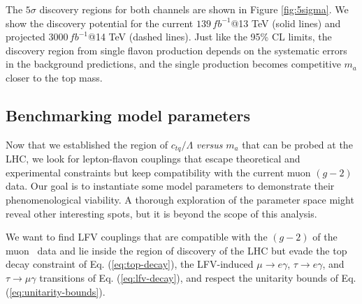 \documentclass[prd,amsfonts,onecolumn,superscriptaddress,aps,nofootinbib,11pt]{revtex4-1}
\begin{document}
The $5\sigma$ discovery regions for both channels are shown in Figure \ref{fig:5sigma}. We show the discovery potential for the current $139 \, \si{fb^{-1}}$@13 TeV (solid lines) and projected $3000 \, \si{fb^{-1}}$@14 TeV (dashed lines). Just like the 95\% CL limits, the discovery region from single flavon production depends on the systematic errors in the background predictions, and the single production becomes competitive $m_a$ closer to the top mass.

\subsection{Benchmarking model parameters}

Now that we established the region of $c_{tq}/\Lambda$ {\it versus} $m_a$ that can be probed at the LHC, we look for lepton-flavon couplings that escape theoretical and experimental constraints but keep compatibility with the current muon $(g-2)$ data. Our goal is to instantiate some model parameters to demonstrate their phenomenological viability. A thorough exploration of the parameter space might reveal other interesting spots, but it is beyond the scope of this analysis.


We want to find  LFV couplings that are compatible with the $(g-2)$ of the muon~\cite{Muong-2:2006rrc,Muong-2:2015xgu,Muong-2:2023cdq} 
data and lie inside the region of discovery of the LHC but evade the top decay constraint of Eq. (\ref{eq:top-decay}), the LFV-induced $\mu\to e\gamma$, $\tau\to e\gamma$, and $\tau\to \mu\gamma$  transitions of Eq. (\ref{eq:lfv-decay}), and respect the unitarity bounds of Eq. (\ref{eq:unitarity-bounds}).

\end{document}
